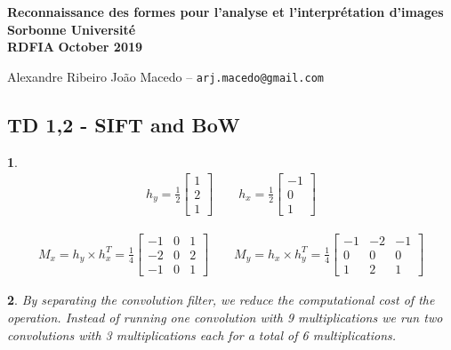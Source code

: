 \documentclass[10pt]{article} %
\theoremstyle{question-style}
\newtheorem{answer}{\arabic{answer}}
\begin{document}
\date{August 2018}
\noindent
\normalsize\textbf{Reconnaissance des formes pour l’analyse et l’interprétation d’images} \hfill \textbf{Sorbonne Université}\\
\normalsize\textbf{RDFIA} \hfill \textbf{October 2019}

{\small Alexandre Ribeiro João Macedo --  \texttt{arj.macedo@gmail.com}}\vspace{20pt}

\begin{flushleft}


\section*{TD 1,2 - SIFT and BoW}

\begin{answer} %
\begin{align*}
    h_y = \frac{1}{2} \begin{bmatrix}
    1 \\
    2 \\
    1
    \end{bmatrix} 
    \qquad
     h_x = \frac{1}{2} \begin{bmatrix}
    -1 \\
    0 \\
    1
    \end{bmatrix}
\end{align*}

\begin{align*}
    M_x = h_y \times h_x^T = \frac{1}{4} \begin{bmatrix}
    -1 & 0 & 1\\
    -2 & 0 & 2 \\
    -1 & 0 & 1
    \end{bmatrix}
    \qquad
    M_y = h_x \times h_y^T = \frac{1}{4} \begin{bmatrix}
    -1 & -2 & -1 \\
    0 & 0 & 0 \\
    1 & 2 & 1
    \end{bmatrix}
\end{align*}
\end{answer}

\begin{answer}
By separating the convolution filter, we reduce the computational cost of the operation. Instead of running one convolution with 9 multiplications we run two convolutions with 3 multiplications each for a total of 6 multiplications.
\end{answer}


\end{flushleft}
\end{document}
